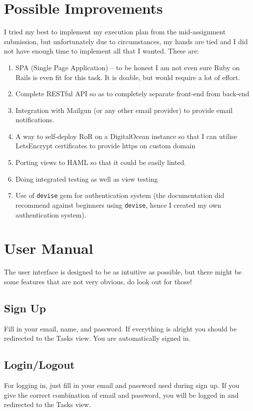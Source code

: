 \documentclass[12pt, a4paper]{article}
\begin{document}
	\section{Possible Improvements}
		I tried my best to implement my execution plan from the mid-assignment submission, but unfortunately due to circumstances, my hands are tied and I did not have enough time to implement all that I wanted. These are:
		\begin{enumerate}
			\item SPA (Single Page Application) -- to be honest I am not even sure Ruby on Rails is even fit for this task. It is doable, but would require a lot of effort.
			\item Complete RESTful API so as to completely separate front-end from back-end
			\item Integration with Mailgun (or any other email provider) to provide email notifications.
			\item A way to self-deploy RoR on a DigitalOcean instance so that I can utilise LetsEncrypt certificates to provide https on custom domain
			\item Porting views to HAML so that it could be easily linted.
			\item Doing integrated testing as well as view testing
			\item Use of \texttt{devise} gem for authentication system (the documentation did recommend against beginners using \texttt{devise}, hence I created my own authentication system).
		\end{enumerate}
	\section{User Manual}
		The user interface is designed to be as intuitive as possible, but there might be some features that are not very obvious, do look out for those!
		
		\subsection{Sign Up}
		Fill in your email, name, and password. If everything is alright you should be redirected to the Tasks view. You are automatically signed in.
		
		\subsection{Login/Logout}
		For logging in, just fill in your email and password used during sign up. If you give the correct combination of email and password, you will be logged in and redirected to the Tasks view.
		
\end{document}
